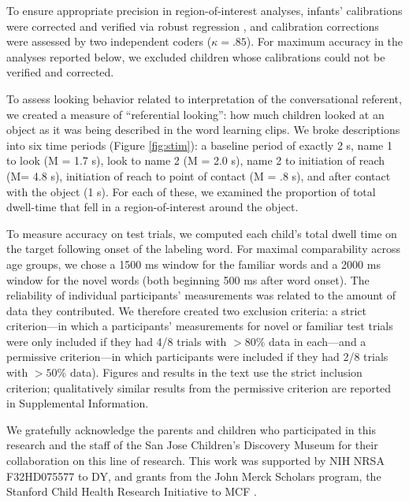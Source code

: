 \documentclass{pnastwo}
\begin{document}
\begin{article}
\begin{materials}
To ensure appropriate precision in region-of-interest analyses, infants' calibrations were corrected and verified via robust regression \cite<described in>{frank2012}, and calibration corrections were assessed by two independent coders ($\kappa = .85$). For maximum accuracy in the analyses reported below, we excluded children whose calibrations could not be verified and corrected.

To assess looking behavior related to interpretation of the conversational referent, we created a measure of  ``referential looking'': how much children looked at an object as it was being described in the word learning clips. We broke descriptions into six time periods (Figure \ref{fig:stim}): a baseline period of exactly 2 s, name 1 to look (M = 1.7 s), look to name 2 (M = 2.0 s), name 2 to initiation of reach (M= 4.8 s), initiation of reach to point of contact (M = .8 s), and after contact with the object (1 s). For each of these, we examined the proportion of total dwell-time that fell in a region-of-interest around the object. 

To measure accuracy on test trials, we computed each child's total dwell time on the target following onset of the labeling word. For maximal comparability across age groups,  we chose a 1500 ms window for the familiar words and a 2000 ms window for the novel words (both beginning 500 ms after word onset). The reliability of individual participants' measurements was related to the amount of data they contributed. We therefore created two exclusion criteria: a strict criterion---in which a participants' measurements for novel or familiar test trials were only included if they had 4/8 trials with $>80\%$ data in each---and a permissive criterion---in which participants were included if they had 2/8 trials with $>50\%$ data). Figures and results in the text use the strict inclusion criterion; qualitatively similar results from the permissive criterion are reported in Supplemental Information.
\end{materials}

\begin{acknowledgments}
We gratefully acknowledge the parents and children who participated in this research and the staff of the San Jose Children's Discovery Museum for their collaboration on this line of research. This work was supported by NIH NRSA F32HD075577 to DY,  and grants from the John Merck Scholars program, the Stanford Child Health Research Initiative to MCF .
\end{acknowledgments}




\end{article}
\end{document}
